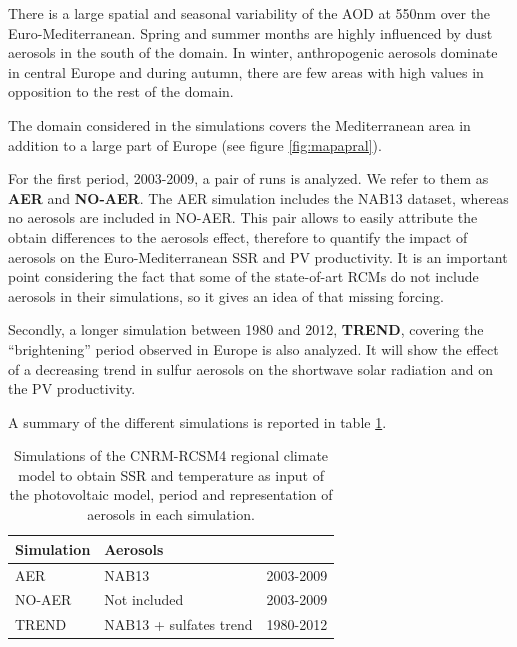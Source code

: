 There is a large spatial and seasonal variability of the AOD at 550nm over the Euro-Mediterranean. Spring and summer months are highly influenced by dust aerosols in the south of the domain. In winter, anthropogenic aerosols dominate in central Europe and during autumn, there are few areas with high values in opposition to the rest of the domain.

The domain considered in the simulations covers the Mediterranean area in addition to a large part of Europe (see figure \ref{fig:mapapral}).

For the first period, 2003-2009, a pair of runs is analyzed. We refer to them as \textbf{AER} and \textbf{NO-AER}. The AER simulation includes the NAB13 dataset, whereas no aerosols are included in NO-AER. This pair allows to easily attribute the obtain differences to the aerosols effect, therefore to quantify the impact of aerosols on the Euro-Mediterranean SSR and PV productivity. It is an important point considering the fact that some of the state-of-art RCMs do not include aerosols in their simulations, so it gives an idea of that missing forcing.

Secondly, a longer simulation between 1980 and 2012, \textbf{TREND}, covering the ``brightening'' period observed in Europe is also analyzed. It will show the effect of a decreasing trend in sulfur aerosols on the shortwave solar radiation and on the PV productivity.  

A summary of the different simulations is reported in table \ref{tabSIM}.

\begin{table}
  \begin{tabular}{>{\raggedright}m{2cm}>{\raggedright}m{3cm}>{\raggedright}m{2cm}}
    \toprule 
    Simulation & Aerosols & \centering{Period}\tabularnewline
    \midrule
    AER & NAB13 & 2003-2009
    \tabularnewline
    \midrule
    NO-AER & Not included & 2003-2009
   \tabularnewline
   \midrule           
  TREND & NAB13 + sulfates trend & 1980-2012
   \tabularnewline
    \bottomrule
  \end{tabular}
  \caption[Simulations of the CNRM-RCSM4 used as input of the PV model, period and aerosols representation]{Simulations of the CNRM-RCSM4 regional climate model to obtain SSR and temperature as input of the photovoltaic model, period and representation of aerosols in each simulation.}
\label{tabSIM}
\end{table}

